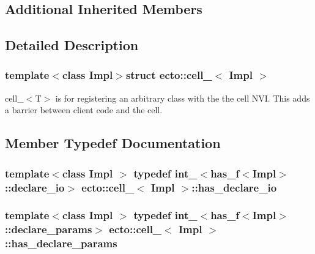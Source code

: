 \subsection*{Additional Inherited Members}


\subsection{Detailed Description}
\subsubsection*{template$<$class Impl$>$struct ecto\+::cell\+\_\+$<$ Impl $>$}

cell\+\_\+$<$\+T$>$ is for registering an arbitrary class with the the cell N\+V\+I. This adds a barrier between client code and the cell. 

\subsection{Member Typedef Documentation}
\hypertarget{structecto_1_1cell___a10ab0d3f85e194d548beb3251416a569}{}
\subsubsection[{has\+\_\+declare\+\_\+io}]{\setlength{\rightskip}{0pt plus 5cm}template$<$class Impl $>$ typedef {\bf int\+\_\+}$<${\bf has\+\_\+f}$<$Impl$>$\+::{\bf declare\+\_\+io}$>$ {\bf ecto\+::cell\+\_\+}$<$ Impl $>$\+::{\bf has\+\_\+declare\+\_\+io}}\label{structecto_1_1cell___a10ab0d3f85e194d548beb3251416a569}
\hypertarget{structecto_1_1cell___ab7b111eb2672ae4eaacc668852b8b89f}{}
\subsubsection[{has\+\_\+declare\+\_\+params}]{\setlength{\rightskip}{0pt plus 5cm}template$<$class Impl $>$ typedef {\bf int\+\_\+}$<${\bf has\+\_\+f}$<$Impl$>$\+::{\bf declare\+\_\+params}$>$ {\bf ecto\+::cell\+\_\+}$<$ Impl $>$\+::{\bf has\+\_\+declare\+\_\+params}}\label{structecto_1_1cell___ab7b111eb2672ae4eaacc668852b8b89f}
\hypertarget{structecto_1_1cell___a63c5c3dd95630a508017730ee345c23a}{}
